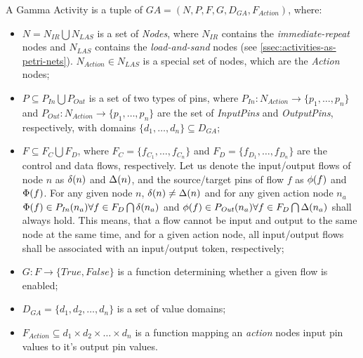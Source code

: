 \begin{definition}
	A Gamma Activity is a tuple of \(\mathit{GA} = (N, P, F, G, D_\mathit{GA}, F_{Action})\), where:
	
	\begin{itemize}
		\item \(N = N_\mathit{IR} \bigcup N_\mathit{LAS} \) is a set of \emph{Nodes}, where \(N_\mathit{IR}\) contains the \emph{immediate-repeat} nodes and \(N_\mathit{LAS}\) contains the \emph{load-and-sand} nodes (see \autoref{ssec:activities-as-petri-nets}). \(N_\mathit{Action} \in N_\mathit{LAS} \) is a special set of nodes, which are the \emph{Action} nodes;
		\item \( P \subseteq P_\mathit{In} \bigcup P_\mathit{Out} \) is a set of two types of pins, where \(P_\mathit{In} : N_\mathit{Action} \rightarrow \{ p_1, \dots, p_n \} \) and \(P_\mathit{Out} : N_\mathit{Action} \rightarrow \{ p_1, \dots, p_n \} \) are the set of \emph{InputPins} and \emph{OutputPins}, respectively, with domains \(\{ d_1, \dots, d_n \} \subseteq D_\mathit{GA} \);
		\item \( F \subseteq F_C \bigcup F_D \), where \(F_C = \{ f_{C_1}, \dots, f_{C_n} \} \) and \(F_D = \{ f_{D_1}, \dots, f_{D_n} \} \) are the control and data flows, respectively. Let us denote the input/output flows of node \(n\) as \( \delta(n) \) and \( \Delta(n) \), and the source/target pins of flow \(f\) as \( \phi(f) \) and \(\Phi(f)\). For any given node \(n\), \( \delta(n) \neq \Delta(n) \) and for any given action node \(n_a\) \( \Phi(f) \in P_\mathit{In}(n_a) \forall f \in F_D \bigcap \delta(n_a) \) and \( \phi(f) \in P_\mathit{Out}(n_a) \forall f \in F_D \bigcap \Delta(n_a) \) shall always hold. This means, that a flow cannot be input and output to the same node at the same time, and for a given action node, all input/output flows shall be associated with an input/output token, respectively;
		\item \(G : F \rightarrow \{ \mathit{True}, \mathit{False} \} \) is a function determining whether a given flow is enabled;
		\item \(D_\mathit{GA} = \{ d_{1}, d_{2}, \dots, d_{n} \} \) is a set of value domains;
		\item \(F_{Action} \subseteq d_{1} \times d_{2} \times \dots \times d_{n} \) is a function mapping an \emph{action} nodes input pin values to it's output pin values.
	\end{itemize}
	

\end{definition}
